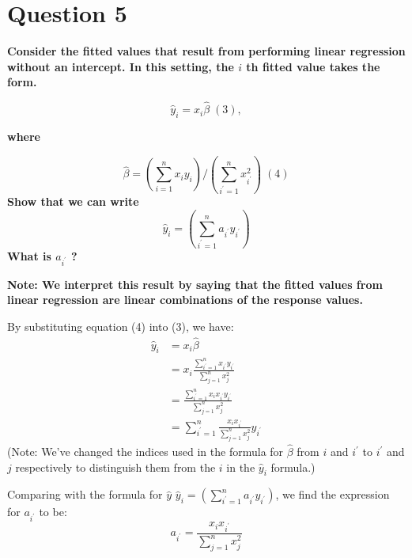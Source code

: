 \documentclass[
]{article}
\begin{document}
\hypertarget{question-5}{%
\section{Question 5}\label{question-5}}

\textbf{Consider the fitted values that result from performing linear
regression without an intercept. In this setting, the \(i\) th fitted
value takes the form.}

\[
\hat{y}_{i}=x_{i} \hat{\beta}\;(3),
\]

\textbf{where}

\[
\hat{\beta}=\left(\sum_{i=1}^{n} x_{i} y_{i}\right) /\left(\sum_{i^{\prime}=1}^{n} x_{i^{\prime}}^{2}\right)\; (4)
\] \textbf{Show that we can write} \[
\hat{y}_{i}=\left(\sum_{i^{\prime}=1}^{n} a_{i^{\prime}} y_{i^{\prime}}\right)
\] \textbf{What is \(a_{i^{\prime}}\) ?}

\textbf{Note: We interpret this result by saying that the fitted values
from linear regression are linear combinations of the response values.}

By substituting equation (4) into (3), we have: \[
\begin{aligned}
\hat{y}_{i}&=x_{i}\hat{\beta}\\
& = x_i\frac{\sum_{i^{\prime}=1}^{n} x_{i^{\prime}} y_{i^{\prime}}} {\sum_{j=1}^{n} x_{j}^{2}}\\
& = \frac{\sum_{i^{\prime}=1}^{n}x_i x_{i^{\prime}}y_{i^{\prime}}}{\sum_{j=1}^{n}x_{j}^{2}}\\
& = \sum_{i^{\prime}=1}^{n}\frac{x_i x_{i^{\prime}}}{\sum_{j=1}^{n}x_{j}^{2}}y_{i^{\prime}}
\end{aligned}
\] (Note: We've changed the indices used in the formula for
\(\hat{\beta}\) from \(i\) and \(i^{\prime}\) to \(i^{\prime}\) and
\(j\) respectively to distinguish them from the \(i\) in the
\(\hat{y}_i\) formula.)

Comparing with the formula for \(\hat{y}\)
\(\hat{y}_{i}=\left(\sum_{i^{\prime}=1}^{n} a_{i^{\prime}} y_{i^{\prime}}\right)\),
we find the expression for \(a_{i^{\prime}}\) to be: \[
a_{i^{\prime}} = \frac{x_i x_{i^{\prime}}}{\sum_{j=1}^{n}x_{j}^{2}}
\]
\end{document}
